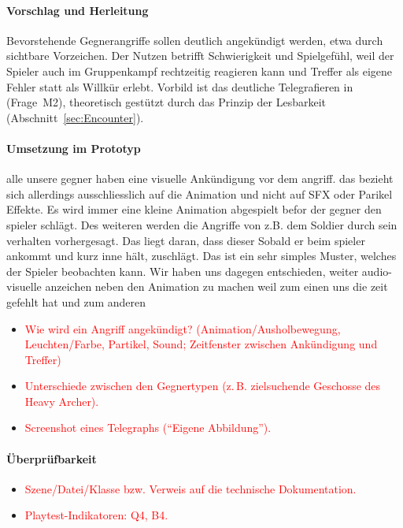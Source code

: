 \documentclass[../Main.tex]{subfiles}
\begin{document}
\paragraph{Vorschlag und Herleitung}
Bevorstehende Gegnerangriffe sollen deutlich angekündigt werden, etwa durch sichtbare Vorzeichen. Der Nutzen betrifft Schwierigkeit und Spielgefühl, weil der Spieler auch im Gruppenkampf rechtzeitig reagieren kann und Treffer als eigene Fehler statt als Willkür erlebt. Vorbild ist das deutliche Telegrafieren in  (Frage~M2), theoretisch gestützt durch das Prinzip der Lesbarkeit (Abschnitt~\ref{sec:Encounter}).

\paragraph{Umsetzung im Prototyp}

alle unsere gegner haben eine visuelle Ankündigung vor dem angriff. das bezieht sich allerdings ausschliesslich auf die Animation und nicht auf SFX oder Parikel Effekte. Es wird immer eine kleine Animation abgespielt befor der gegner den spieler schlägt. Des weiteren werden die Angriffe von z.B. dem Soldier durch sein verhalten vorhergesagt. Das liegt daran, dass dieser Sobald er beim spieler ankommt und kurz inne hält, zuschlägt. Das ist ein sehr simples Muster, welches der Spieler beobachten kann. Wir haben uns dagegen entschieden, weiter audio-visuelle anzeichen neben den Animation zu machen weil zum einen uns die zeit gefehlt hat und zum anderen

\begin{itemize}[leftmargin=1.5cm]
    \item \textcolor{red}{Wie wird ein Angriff angekündigt? (Animation/Ausholbewegung, Leuchten/Farbe, Partikel, Sound; Zeitfenster zwischen Ankündigung und Treffer)}
    \item \textcolor{red}{Unterschiede zwischen den Gegnertypen (z.\,B. zielsuchende Geschosse des Heavy Archer).}
    \item \textcolor{red}{Screenshot eines Telegraphs (\enquote{Eigene Abbildung}).}
\end{itemize}

\paragraph{Überprüfbarkeit}
\begin{itemize}[leftmargin=1.5cm]
    \item \textcolor{red}{Szene/Datei/Klasse bzw. Verweis auf die technische Dokumentation.}
    \item \textcolor{red}{Playtest-Indikatoren: Q4, B4.}
\end{itemize}
\end{document}
